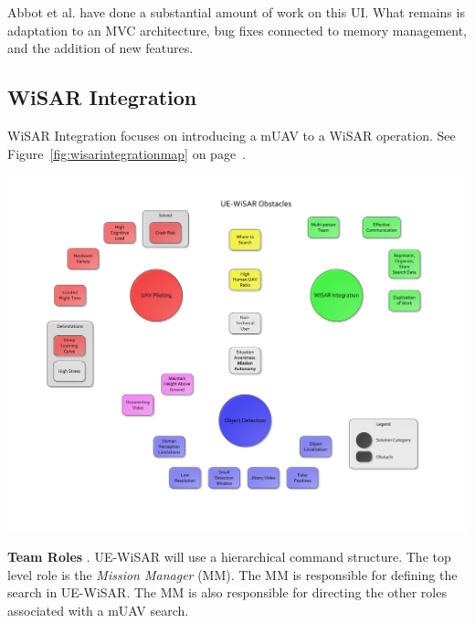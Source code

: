 \documentclass[12pt]{IEEEtran}
\begin{document}
Abbot et al. have done a substantial amount of work on this UI.  What remains is
adaptation to an MVC architecture, bug fixes connected to memory management, and
the addition of new features.

\subsection{WiSAR Integration}
WiSAR Integration focuses on introducing a mUAV to a
WiSAR operation.  See Figure~\ref{fig:wisarintegrationmap} on
page~\pageref{fig:wisarintegrationmap}.

\begin{mapping*}[htp]
	\vspace{-80pt}
	\hspace{-80pt}
	\includegraphics[keepaspectratio=true, width=\paperheight, height=\paperheight,
	 page=2, angle=90]{obstacle_solution_map.pdf}
	 \label{fig:wisarintegrationmap}
\end{mapping*}

\textbf{Team Roles} \cite{goodrich2008supporting,adams2009cognitive,goodrich2007using}.  UE-WiSAR will use a hierarchical command structure.
The top level role is the \emph{Mission Manager} (MM).  The MM is responsible
for defining the search in UE-WiSAR.  The MM is also responsible for directing
the other roles associated with a mUAV search.
\end{document}
